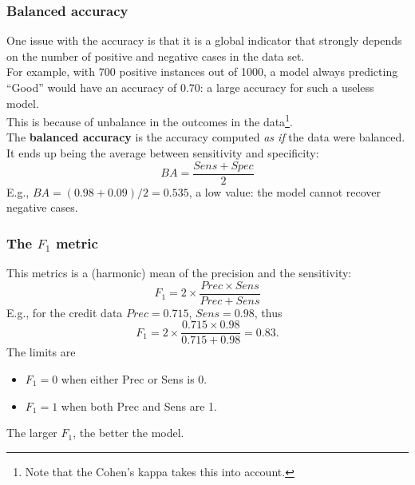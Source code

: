 \begin{frame}
\frametitle{Balanced accuracy}
One issue with the accuracy is that it is a global indicator that strongly depends on the number of positive and negative cases in the data set.\\
\vspace{0.2cm}
For example, with 700 positive instances out of 1000, a model always predicting ``Good'' would have an accuracy of 0.70: a large accuracy for such a useless model.\\
\vspace{0.2cm}
This is because of unbalance in the outcomes in the data\footnote{Note that the Cohen's kappa takes this into account.}.\\
\vspace{0.3cm}
The {\bf balanced accuracy} is the accuracy computed {\it as if} the data were balanced. It ends up being the average between sensitivity and specificity:
$$
BA = \frac{Sens+Spec}{2}
$$
E.g., $BA=(0.98+0.09)/2=0.535$, a low value: the model cannot recover negative cases.
\end{frame}
\begin{frame}
\frametitle{The $F_1$ metric}
This metrics is a (harmonic) mean of the precision and the sensitivity:
$$
F_1 = 2 \times \frac{Prec\times Sens}{Prec+Sens}
$$
E.g., for the credit data $Prec = 0.715$, $Sens = 0.98$, thus
$$
F_1 = 2 \times\frac{0.715\times 0.98}{0.715+0.98} = 0.83.
$$
The limits are
\begin{itemize}
\item $F_1 = 0$ when either Prec or Sens is 0.
\item $F_1 = 1$ when both Prec and Sens are 1.
\end{itemize}
The larger $F_1$, the better the model.
\end{frame}
